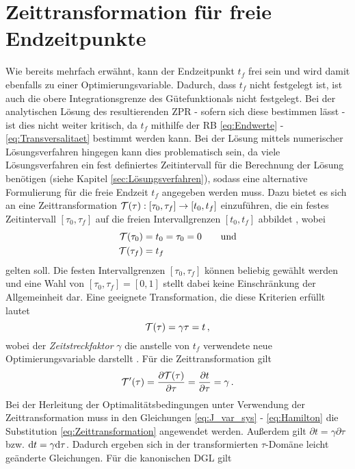 \section{Zeittransformation für freie Endzeitpunkte}\label{sec:Zeittransformation}
Wie bereits mehrfach erwähnt, kann der Endzeitpunkt $t_f$ frei sein und wird damit ebenfalls zu einer Optimierungsvariable. Dadurch, dass $t_f$ nicht festgelegt ist, ist auch die obere Integrationsgrenze des Gütefunktionals nicht festgelegt. Bei der analytischen Lösung des resultierenden \gls{ZPR} - sofern sich diese bestimmen lässt - ist dies nicht weiter kritisch, da $t_f$ mithilfe der \gls{RB} \ref{eq:Endwerte} - \ref{eq:Transversalitaet} bestimmt werden kann. Bei der Lösung mittels numerischer Lösungsverfahren hingegen kann dies problematisch sein, da viele Lösungsverfahren ein fest definiertes Zeitintervall für die Berechnung der Lösung benötigen (siehe Kapitel \ref{sec:Lösungsverfahren}), sodass eine alternative Formulierung für die freie Endzeit $t_f$ angegeben werden muss. Dazu bietet es sich an eine Zeittransformation $\mathcal{T}(\tau): [\tau_0, \tau_f] \rightarrow [t_0, t_f]$ einzuführen, die ein festes Zeitintervall $[\tau_0, \tau_f]$ auf die freien Intervallgrenzen $[t_0, t_f]$ abbildet \cite{Gerdts.2010}, wobei 
\begin{align}
	\mathcal{T}(\tau_0) &= t_0 = \tau_0 = 0 \qquad \textrm{und} \\
	\mathcal{T}(\tau_f) &= t_f
\end{align}
gelten soll. Die festen Intervallgrenzen $[\tau_0, \tau_f]$ können beliebig gewählt werden und eine Wahl von $[\tau_0, \tau_f] = [0, 1]$ stellt dabei keine Einschränkung der Allgemeinheit dar. Eine geeignete Transformation, die diese Kriterien erfüllt lautet
\begin{equation}
	\mathcal{T}(\tau) = \gamma\tau = t\,, \label{eq:Zeittransformation}
\end{equation}
wobei der \textit{Zeitstreckfaktor} $\gamma$ die anstelle von $t_f$ verwendete neue Optimierungsvariable darstellt \cite{KnutGraichen.2012}. Für die Zeittransformation gilt 
\begin{equation}
	\mathcal{T}'(\tau) = \frac{\partial\mathcal{T}(\tau)}{\partial\tau} = \frac{\partial t}{\partial\tau} = \gamma\,.
\end{equation}
Bei der Herleitung der Optimalitätsbedingungen unter Verwendung der Zeittransformation muss in den Gleichungen \ref{eq:J_var_sys} - \ref{eq:Hamilton} die Substitution \ref{eq:Zeittransformation} angewendet werden. Außerdem gilt $\partial t = \gamma\partial\tau$ bzw. $\textrm{d}{t} = \gamma\textrm{d}{\tau}$. Dadurch ergeben sich in der transformierten $\tau$-Domäne leicht geänderte Gleichungen. Für die kanonischen \gls{DGL} gilt 
